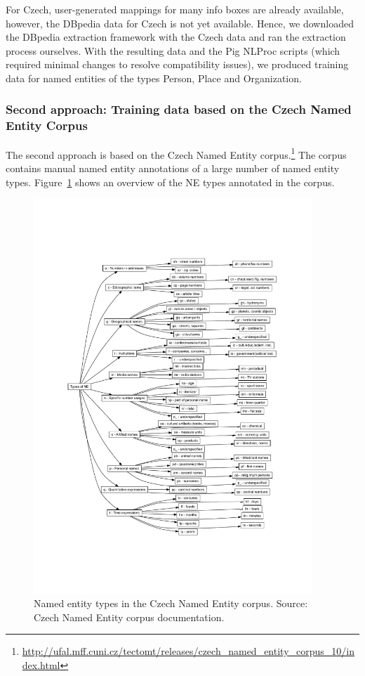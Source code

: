 For Czech, user-generated mappings for many info boxes are already available, however,
the DBpedia data for Czech is not yet available. Hence, we downloaded the DBpedia
extraction framework with the Czech data and ran the extraction process ourselves.
With the resulting data and the Pig NLProc scripts (which required minimal changes
to resolve compatibility issues), we produced training data for named entities of the types
Person, Place and Organization.



\subsubsection*{Second approach: Training data based on the Czech Named Entity Corpus}

The second approach is based on the Czech Named Entity corpus.\footnote{\url{http://ufal.mff.cuni.cz/tectomt/releases/czech_named_entity_corpus_10/index.html}}
The corpus contains manual named entity annotations of a large number of named entity types. Figure~\ref{fig:figures_core_CzechNECorpus}
shows an overview of the NE types annotated in the corpus.


\begin{figure}[h]
	\centering
		\includegraphics[width=10.5cm]{figures/core/CzechNECorpus.pdf}
	\caption{Named entity types in the Czech Named Entity corpus. Source: Czech Named Entity corpus documentation.}
	\label{fig:figures_core_CzechNECorpus}
\end{figure}


